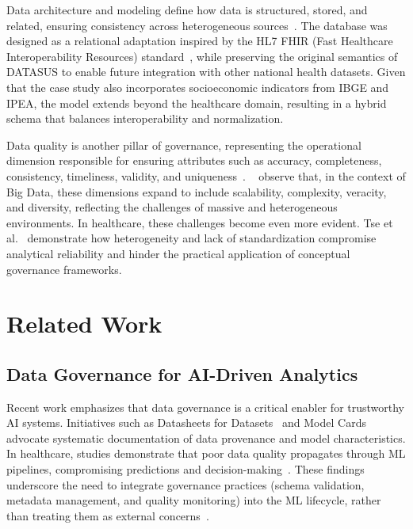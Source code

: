 \documentclass[sigconf,natbib=false]{acmart}
\begin{document}
Data architecture and modeling define how data is structured, stored, and related, ensuring consistency across heterogeneous sources~\cite{dama2017}. The database was designed as a relational adaptation inspired by the HL7 FHIR (Fast Healthcare Interoperability Resources) standard~\cite{hl7fhir2024}, while preserving the original semantics of DATASUS to enable future integration with other national health datasets. Given that the case study also incorporates socioeconomic indicators from IBGE and IPEA, the model extends beyond the healthcare domain, resulting in a hybrid schema that balances interoperability and normalization.

Data quality is another pillar of governance, representing the operational dimension responsible for ensuring attributes such as accuracy, completeness, consistency, timeliness, validity, and uniqueness~\cite{dama2017}. ~\cite{mishra2024} observe that, in the context of Big Data, these dimensions expand to include scalability, complexity, veracity, and diversity, reflecting the challenges of massive and heterogeneous environments. In healthcare, these challenges become even more evident. Tse et al.~\cite{Tse2018} demonstrate how heterogeneity and lack of standardization compromise analytical reliability and hinder the practical application of conceptual governance frameworks.







\section{Related Work}
\label{sec:related}


\subsection{Data Governance for AI-Driven Analytics}
Recent work emphasizes that data governance is a critical enabler for trustworthy AI systems. Initiatives such as Datasheets for Datasets~\cite{gebru2021datasheets} and Model Cards~\cite{mitchell2019model} advocate systematic documentation of data provenance and model characteristics. In healthcare, studies demonstrate that poor data quality propagates through ML pipelines, compromising predictions and decision-making~\cite{reddy2020}. These findings underscore the need to integrate governance practices (schema validation, metadata management, and quality monitoring) into the ML lifecycle, rather than treating them as external concerns~\cite{janssen2020}.
\end{document}
